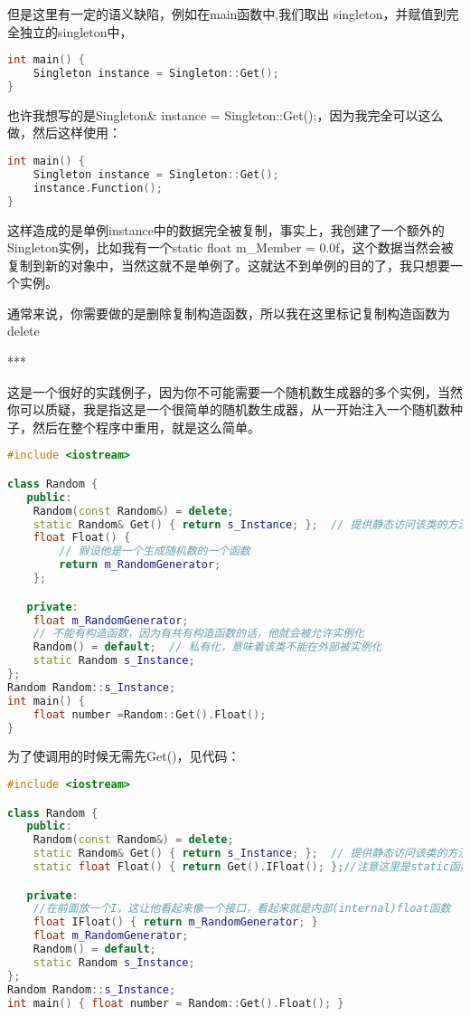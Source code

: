 但是这里有一定的语义缺陷，例如在{\ncodestyle main}函数中,我们取出 {\ncodestyle singleton}，并赋值到完全独立的{\ncodestyle singleton}中，

\begin{lstlisting}[language=c++]
int main() {
    Singleton instance = Singleton::Get();
}
\end{lstlisting}


也许我想写的是{\ncodestyle Singleton\& instance = Singleton::Get();}，因为我完全可以这么做，然后这样使用：

\begin{lstlisting}[language=c++]
int main() {
    Singleton instance = Singleton::Get();
    instance.Function();
}
\end{lstlisting}


这样造成的是单例{\ncodestyle instance}中的数据完全被复制，事实上，我创建了一个额外的{\ncodestyle Singleton}实例，比如我有一个{\ncodestyle static float m_Member = 0.0f}，这个数据当然会被复制到新的对象中，当然这就不是单例了。这就达不到单例的目的了，我只想要一个实例。

通常来说，你需要做的是删除复制构造函数，所以我在这里标记复制构造函数为{\ncodestyle delete}

***

这是一个很好的实践例子，因为你不可能需要一个随机数生成器的多个实例，当然你可以质疑，我是指这是一个很简单的随机数生成器，从一开始注入一个随机数种子，然后在整个程序中重用，就是这么简单。

\begin{lstlisting}[language=c++]
#include <iostream>

class Random {
   public:
    Random(const Random&) = delete;
    static Random& Get() { return s_Instance; };  // 提供静态访问该类的方法
    float Float() {
        // 假设他是一个生成随机数的一个函数
        return m_RandomGenerator;
    };

   private:
    float m_RandomGenerator;
    // 不能有构造函数，因为有共有构造函数的话，他就会被允许实例化
    Random() = default;  // 私有化，意味着该类不能在外部被实例化
    static Random s_Instance;
};
Random Random::s_Instance;
int main() {
    float number =Random::Get().Float();
}
\end{lstlisting}

为了使调用的时候无需先{\ncodestyle Get()}，见代码：

\begin{lstlisting}[language=c++]
#include <iostream>

class Random {
   public:
    Random(const Random&) = delete;
    static Random& Get() { return s_Instance; };  // 提供静态访问该类的方法
    static float Float() { return Get().IFloat(); };//注意这里是static函数

   private:
    //在前面放一个I，这让他看起来像一个接口，看起来就是内部(internal)float函数
    float IFloat() { return m_RandomGenerator; }
    float m_RandomGenerator;
    Random() = default;
    static Random s_Instance;
};
Random Random::s_Instance;
int main() { float number = Random::Get().Float(); }
\end{lstlisting}


